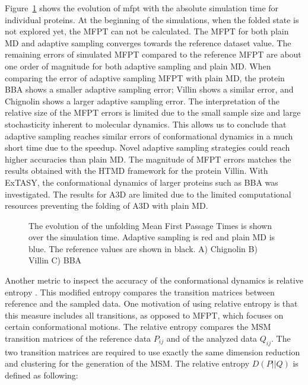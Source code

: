 Figure~\ref{fig:mfpt} shows the evolution of mfpt with the absolute simulation time for individual proteins. At the beginning of the simulations, when the folded state is not explored yet, the MFPT can not be calculated. The MFPT for both plain MD and adaptive sampling converges towards the reference dataset value. The remaining errors of simulated MFPT compared to the reference MFPT are about one order of magnitude for both adaptive sampling and plain MD. When comparing the error of adaptive sampling MFPT with plain MD, the protein BBA shows a smaller adaptive sampling error; Villin shows a similar error, and Chignolin shows a larger adaptive sampling error. The interpretation of the relative size of the MFPT errors is limited due to the small sample size and large stochasticity inherent to molecular dynamics. This allows us to conclude that adaptive sampling reaches similar errors of conformational dynamics in a much short time due to the speedup. Novel adaptive sampling strategies could reach higher accuracies than plain MD. The magnitude of MFPT errors matches the results obtained with the HTMD framework \cite{doerr2016htmd} for the protein Villin. With ExTASY, the conformational dynamics of larger proteins such as BBA was investigated. The results for A3D are limited due to the limited computational resources preventing the folding of A3D with plain MD.  
\begin{figure}[H]
\centering
   \begin{subfigure}[b]{0.5\linewidth}
   {}
   \end{subfigure}%
   
   \begin{subfigure}[b]{0.5\linewidth}
   {}
   \end{subfigure}%
   
   \begin{subfigure}[b]{0.5\linewidth}
   {}
    \end{subfigure}%
  \caption{
  The evolution of the unfolding Mean First Passage Times is shown over the simulation time. Adaptive sampling is red and plain MD is blue. The reference values are shown in black.
  A) Chignolin B) Villin C) BBA } 
  \label{fig:mfpt}
\end{figure}


Another metric to inspect the accuracy of the conformational dynamics is relative entropy \cite{bowman2010enhanced}. This modified entropy compares the transition matrices between reference and the sampled data. One motivation of using relative entropy is that this measure includes all transitions, as opposed to MFPT, which focuses on certain conformational motions. 
The relative entropy compares the MSM transition matrices of the reference data $P_{ij}$ and of the analyzed data $Q_{ij}$. The two transition matrices are required to use exactly the same dimension reduction and clustering for the generation of the MSM. The relative entropy $D(P||Q)$ is defined as following: 

